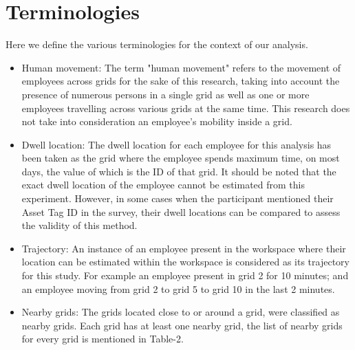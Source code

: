 \documentclass[acmtog]{acmart}
\begin{document}


\section{Terminologies}
Here we define the various terminologies for the context of our analysis. 
\begin{itemize}
    \item Human movement: The term "human movement" refers to the movement of employees across grids for the sake of this research, taking into account the presence of numerous persons in a single grid as well as one or more employees travelling across various grids at the same time. This research does not take into consideration an employee's mobility inside a grid.
    \item Dwell location: The dwell location for each employee for this analysis has been taken as the grid where the employee spends maximum time, on most days, the value of which is the ID of that grid. It should be noted that the exact dwell location of the employee cannot be estimated from this experiment. However, in some cases when the participant mentioned their Asset Tag ID in the survey, their dwell locations can be compared to assess the validity of this method.
    \item Trajectory: An instance of an employee present in the workspace where their location can be estimated within the workspace is considered as its trajectory for this study. For example an employee present in grid 2 for 10 minutes; and an employee moving from grid 2 to grid 5 to grid 10 in the last 2 minutes.
    \item Nearby grids: The grids located close to or around a grid, were classified as nearby grids. Each grid has at least one nearby grid, the list of nearby grids for every grid is mentioned in Table-2.
\end{itemize}


\end{document}
